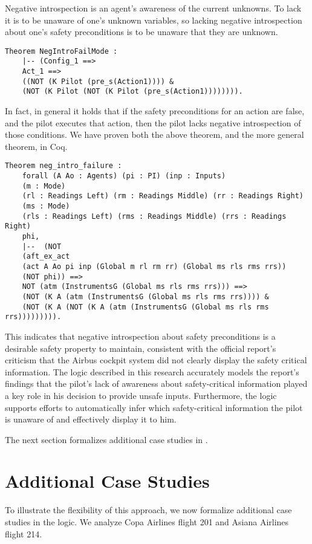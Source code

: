 Negative introspection is an agent's awareness of the current unknowns. To lack it is to be unaware of one's unknown variables, so lacking negative introspection about one's safety preconditions is to be unaware that they are unknown.
\begin{tcolorbox}\begin{lstlisting}[language=Coq]
	Theorem NegIntroFailMode : 
	|-- (Config_1 ==> 
	Act_1 ==>
	((NOT (K Pilot (pre_s(Action1)))) &
	(NOT (K Pilot (NOT (K Pilot (pre_s(Action1)))))))).
	\end{lstlisting}\end{tcolorbox}
In fact, in general it holds that if the safety preconditions for an action are false, and the pilot executes that action, then the pilot lacks negative introspection of those conditions. We have proven both the above theorem, and the more general theorem, in Coq.
\begin{tcolorbox}\begin{lstlisting}[language=Coq]
	Theorem neg_intro_failure : 
	forall (A Ao : Agents) (pi : PI) (inp : Inputs) 
	(m : Mode) 
	(rl : Readings Left) (rm : Readings Middle) (rr : Readings Right) 
	(ms : Mode) 
	(rls : Readings Left) (rms : Readings Middle) (rrs : Readings Right) 
	phi,
	|--  (NOT 
	(aft_ex_act 
	(act A Ao pi inp (Global m rl rm rr) (Global ms rls rms rrs)) 
	(NOT phi)) ==>
	NOT (atm (InstrumentsG (Global ms rls rms rrs))) ==>
	(NOT (K A (atm (InstrumentsG (Global ms rls rms rrs)))) & 
	(NOT (K A (NOT (K A (atm (InstrumentsG (Global ms rls rms rrs))))))))).
	\end{lstlisting}
\end{tcolorbox}
This indicates that negative introspection about safety preconditions is a desirable safety property to maintain, consistent with the official report's criticism that the Airbus cockpit system did not clearly display the safety critical information. The logic described in this research accurately models the report's findings that the pilot's lack of awareness about safety-critical information played a key role in his decision to provide unsafe inputs. Furthermore, the logic supports efforts to automatically infer which safety-critical information the pilot is unaware of and effectively display it to him. 

The next section formalizes additional case studies in \DASL.

\section{Additional Case Studies}
\noindent
To illustrate the flexibility of this approach, we now formalize additional case studies in the logic. We analyze Copa Airlines flight 201 and Asiana Airlines flight 214.

